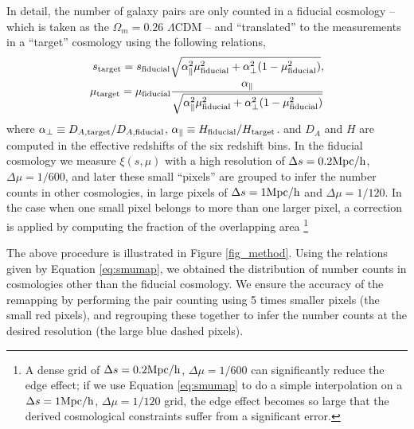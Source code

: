 \documentclass[iop]{emulateapj}
\begin{document}
In detail, the number of galaxy pairs are only counted in a fiducial cosmology
-- which is taken as the $\Omega_m=0.26$ $\Lambda$CDM --
and ``translated'' to the measurements in a ``target'' cosmology using the following relations, 
\begin{eqnarray}\label{eq:smumap}
 s_{\rm target} = s_{\rm fiducial} \sqrt{\alpha_{\parallel}^2 \mu_{\rm fiducial}^2+\alpha_{\bot}^2(1-\mu_{\rm fiducial}^2)}, \\
 \mu_{\rm target} = \mu_{\rm fiducial} \frac{\alpha_\parallel}
 {\sqrt{\alpha_{\parallel}^2 \mu_{\rm fiducial}^2 +\alpha_{\bot}^2(1-\mu_{\rm fiducial}^2)}}
\end{eqnarray}
where $\alpha_{\bot}\equiv D_{A,\rm target}/D_{A,\rm fiducial}$,
$\alpha_{\parallel}\equiv H_{\rm fiducial}/H_{\rm target}$.
and $D_A$ and $H$ are computed in the effective redshifts of the six redshift bins.
In the fiducial cosmology
we measure $\xi(s,\mu)$ with a high resolution of
$\Delta s = 0.2 {\rm Mpc/h}$, $\Delta \mu = 1/600$,
and later these small ``pixels'' are grouped to infer 
the number counts in other cosmologies, 
in large pixels of $\Delta s = 1 {\rm Mpc/h}$ and $\Delta \mu = 1/120$.
In the case when one small pixel belongs to more than one larger pixel,
a correction is applied by computing the fraction of the overlapping area
\footnote{A dense grid of $\Delta s = 0.2 {\rm Mpc/h}$, $\Delta \mu = 1/600$ can significantly reduce the edge effect;
if we use Equation \ref{eq:smumap} to do a simple interpolation on a $\Delta s = 1 {\rm Mpc/h}$, $\Delta \mu = 1/120$  grid,
the edge effect becomes so large that the derived cosmological constraints suffer from a significant error.}

The above procedure is illustrated in Figure \ref{fig_method}.
Using the relations given by Equation \ref{eq:smumap},
we obtained the distribution of number counts in cosmologies other than the fiducial cosmology.
We ensure the accuracy of the remapping by performing the pair counting using 5 times smaller pixels (the small red pixels), 
and regrouping these together to infer the number counts at the desired resolution (the large blue dashed pixels).
\end{document}
